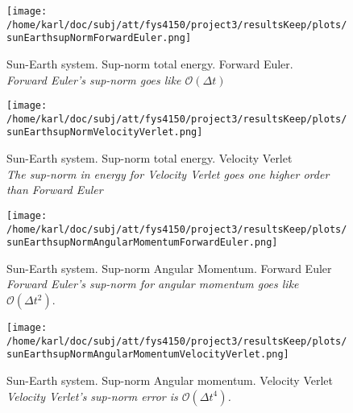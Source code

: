 \documentclass{article}
\begin{document}
\begin{minipage}{.45\textwidth} 
	\begin{figure}[H]
		\centering
		\texttt{[image: /home/karl/doc/subj/att/fys4150/project3/resultsKeep/plots/sunEarthsupNormForwardEuler.png]}
		\caption{Sun-Earth system. Sup-norm total energy. Forward Euler. \\ \textit{Forward Euler's sup-norm goes like $\mathcal{O}(\Delta t)$}}
		\label{1}
	\end{figure}
\end{minipage}\hfill
\begin{minipage}{.45\textwidth} 
	\begin{figure}[H]
		\centering
		\texttt{[image: /home/karl/doc/subj/att/fys4150/project3/resultsKeep/plots/sunEarthsupNormVelocityVerlet.png]}
		\caption{Sun-Earth system. Sup-norm total energy. Velocity Verlet \\ \textit{The sup-norm in energy for Velocity Verlet goes one higher order than Forward Euler}}
		\label{1}
	\end{figure}
\end{minipage}\hfill
\vspace{2ex}

\begin{minipage}{.45\textwidth} 
	\begin{figure}[H]
		\centering
		\texttt{[image: /home/karl/doc/subj/att/fys4150/project3/resultsKeep/plots/sunEarthsupNormAngularMomentumForwardEuler.png]}
		\caption{Sun-Earth system. Sup-norm Angular Momentum. Forward Euler \\ \textit{Forward Euler's sup-norm for angular momentum goes like $\mathcal{O}(\Delta t^2)$}.}
		\label{1}
	\end{figure}
\end{minipage}\hfill
\begin{minipage}{.45\textwidth} 
	\begin{figure}[H]
		\centering
		\texttt{[image: /home/karl/doc/subj/att/fys4150/project3/resultsKeep/plots/sunEarthsupNormAngularMomentumVelocityVerlet.png]}
		\caption{Sun-Earth system. Sup-norm Angular momentum. Velocity Verlet \\ \textit{Velocity Verlet's sup-norm error is $\mathcal{O}(\Delta t^4)$.}}
		\label{1}
	\end{figure}
\end{minipage}\hfill
\vspace{2ex}
\end{document}

